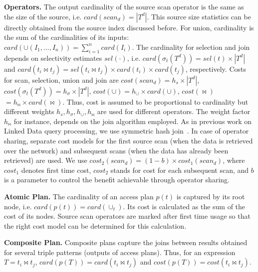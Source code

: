 \textbf{Operators.} The output cardinality of the source scan operator is the same as the size of the source, i.e. $card(scan_d) = |T^d|$. 
This source size statistics can be directly obtained from the source index discussed before. 
For union, cardinality is the sum of the cardinalities of its inputs: $card(\cup(I_1,...,I_n)) = \sum_{i=1}^n card(I_i)$. 
The cardinality for selection and join depends on selectivity estimates $sel(\cdot)$, i.e. $card(\sigma_t(T^d)) = sel(t) \times |T^d|$ and $card(t_i \Join t_j) =
sel(t_i \Join t_j) \times card(t_i) \times card(t_j)$, respectively. 
Costs for scan, selection, union and join are $cost(scan_d) = h_s \times |T^d|$, $cost(\sigma_t(T^d))=h_\sigma \times |T^d|$, $cost(\cup) =
h_\cup \times card(\cup)$, $cost(\Join)$ $=
h_\Join \times card(\Join)$. Thus, cost is assumed to be proportional to cardinality but different weights $h_s,h_\sigma,h_\cup,h_\Join$ are used for different operators. The weight factor $h_\Join$ for instance, depends on the
join algorithm employed. As in previous work on Linked Data query processing, we use symmetric hash join~\cite{ladwig_linked_2010,sihjoin_2011}. In case of operator sharing, separate cost
models for the first source scan (when the data is retrieved over the
network) and subsequent scans (when the data has already been
retrieved) are used. We use $cost_2(scan_d) = (1 - b) \times cost_1(scan_d)$, where $cost_1$ denotes first time cost, $cost_2$ stands for cost for each subsequent scan, and $b$
is a parameter to control the benefit achievable through operator sharing.


\textbf{Atomic Plan.} The cardinality of an access plan $p(t)$ is captured by its root node, i.e. $card(p(t)) = card(\cup_t)$. Its cost is calculated as the sum of the cost of its nodes. Source scan operators are marked after first time usage so that the right cost model can be determined for this calculation. 

\textbf{Composite Plan.} Composite plans capture the joins between results obtained for several triple patterns (outputs of access plans). Thus, for an expression $T = t_i\Join t_j$, $card(p(T))  = card(t_i\Join t_j)$ and $cost(p(T))  = cost(t_i\Join t_j)$.


